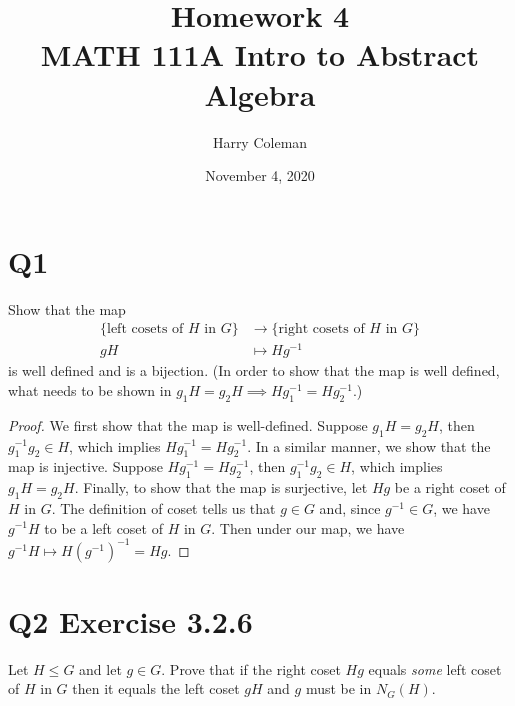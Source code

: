 \documentclass[12pt]{article}
\newenvironment{problem}
    {\begin{lrbox}{\mybox}\begin{minipage}{\textwidth-10pt}}
    {\end{minipage}\end{lrbox}\framebox[6.5in]{\usebox{\mybox}}}
\newcommand{\<}{\left\langle}
\renewcommand{\>}{\right\rangle}
\begin{document}
 
\title{Homework 4\\
    \large MATH 111A Intro to Abstract Algebra
}
\author{Harry Coleman}
\date{November 4, 2020}
\maketitle

\section*{Q1}
\begin{problem}
    Show that the map
    \begin{align*}
        \{\text{left cosets of $H$ in $G$}\} &\to \{\text{right cosets of $H$ in $G$}\} \\
        gH &\mapsto Hg^{-1}
    \end{align*}
    is well defined and is a bijection. (In order to show that the map is well defined, what needs to be shown in $g_1H = g_2 H \implies Hg_1^{-1} = Hg_2^{-1}$.)
\end{problem}

\begin{proof}
    We first show that the map is well-defined. Suppose $g_1H = g_2H$, then $g_1^{-1}g_2\in H$, which implies $Hg_1^{-1} = Hg_2^{-1}$. In a similar manner, we show that the map is injective. Suppose $Hg_1^{-1} = Hg_2^{-1}$, then $g_1^{-1}g_2\in H$, which implies $g_1H = g_2H$. Finally, to show that the map is surjective, let $Hg$ be a right coset of $H$ in $G$. The definition of coset tells us that $g\in G$ and, since $g^{-1}\in G$, we have $g^{-1}H$ to be a left coset of $H$ in $G$. Then under our map, we have $g^{-1}H \mapsto H(g^{-1})^{-1} = Hg$.

\end{proof}

\section*{Q2 Exercise 3.2.6}
\begin{problem}
    Let $H\leq G$ and let $g\in G$. Prove that if the right coset $Hg$ equals \emph{some} left coset of $H$ in $G$ then it equals the left coset $gH$ and $g$ must be in $N_G(H)$.
\end{problem}
\end{document}
